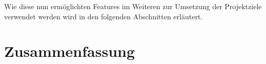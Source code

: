 \documentclass[11pt,twoside,a4paper]{article}
\begin{document}
Wie diese nun ermöglichten Features im Weiteren zur Umsetzung der Projektziele verwendet werden wird in den folgenden Abschnitten erläutert.





\section{Zusammenfassung}


\newpage

\printbibliography
\newpage

\appendix



%
%

%
%
%
\end{document}
